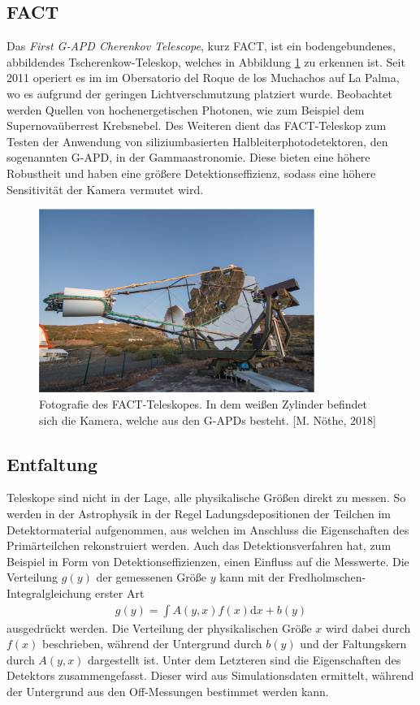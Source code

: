 \subsection{FACT}
Das \textit{First G-APD Cherenkov Telescope}, \cite{Anderhub_2013} kurz FACT, ist ein bodengebundenes, abbildendes Tscherenkow-Teleskop, welches in Abbildung \ref{fig:FACT} zu erkennen ist. Seit 2011 operiert es im  im Obersatorio del Roque de los Muchachos auf La Palma, wo es aufgrund der geringen Lichtverschmutzung platziert wurde.
Beobachtet werden Quellen von hochenergetischen Photonen, wie zum Beispiel dem Supernovaüberrest Krebsnebel. Des Weiteren dient das FACT-Teleskop zum Testen der Anwendung von siliziumbasierten Halbleiterphotodetektoren, den sogenannten G-APD, in der Gammaastronomie. Diese bieten eine höhere Robustheit und haben eine größere Detektionseffizienz, sodass eine höhere Sensitivität der Kamera vermutet wird. \cite{FACTside, Anderhub_2013} 
\begin{figure}
  \centering
  \includegraphics[width=0.8\textwidth]{graphics/Max.png}
  \caption{ Fotografie des FACT-Teleskopes. In dem weißen Zylinder befindet sich die Kamera, welche aus den G-APDs besteht. [M. Nöthe, 2018]}
  \label{fig:FACT}
\end{figure}


\subsection{Entfaltung}
Teleskope sind nicht in der Lage, alle physikalische Größen direkt zu messen. So werden in der Astrophysik in der Regel Ladungsdepositionen der Teilchen im Detektormaterial aufgenommen, aus welchen im Anschluss die Eigenschaften des Primärteilchen rekonstruiert werden. Auch das Detektionsverfahren hat, zum Beispiel in Form von Detektionseffizienzen,  einen Einfluss auf die Messwerte.
Die Verteilung $g(y)$ der gemessenen Größe $y$ kann mit der Fredholmschen-Integralgleichung erster Art
\begin{align}
	g(y)=\int A(y,x)f(x)\text{d}x + b(y)
	\label{eqn:1}
\end{align}
ausgedrückt werden. Die Verteilung der physikalischen Größe $x$ wird dabei durch $f(x)$ beschrieben, während der Untergrund durch $b(y)$ und der Faltungskern durch $A(y,x)$ dargestellt ist. Unter dem Letzteren sind die Eigenschaften des Detektors zusammengefasst. Dieser wird aus Simulationsdaten ermittelt, während der Untergrund aus den Off-Messungen bestimmet werden kann.

